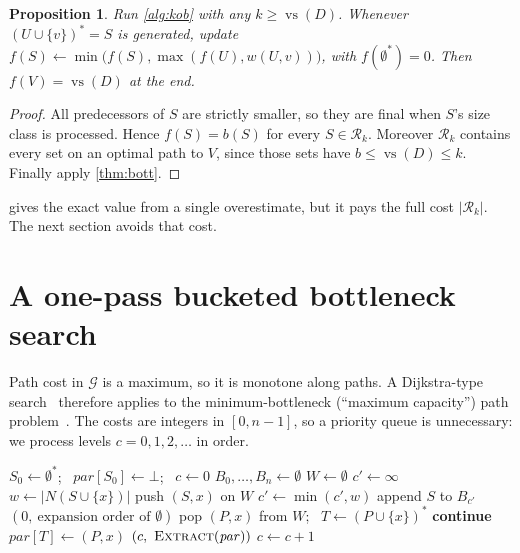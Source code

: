 \documentclass[11pt]{article}
\newtheorem{proposition}[theorem]{Proposition}
\theoremstyle{definition}
\newcommand{\vs}{\operatorname{vs}}
\newcommand{\Rel}{\mathcal{R}}
\newcommand{\Gr}{\mathcal{G}}
\newcommand{\cost}{w}
\newcommand{\bott}{b}
\newcommand{\set}[1]{\{#1\}}
\begin{document}
\begin{proposition}\label{prop:loose}
Run \cref{alg:kob} with any $k\ge\vs(D)$. Whenever $(U\cup\set v)^*=S$ is
generated, update
$f(S)\gets\min\bigl(f(S),\max(f(U),\cost(U,v))\bigr)$, with
$f(\emptyset^*)=0$. Then $f(V)=\vs(D)$ at the end.
\end{proposition}
\begin{proof}
All predecessors of $S$ are strictly smaller, so they are final when $S$'s
size class is processed. Hence $f(S)=\bott(S)$ for every $S\in\Rel_k$.
Moreover $\Rel_k$ contains every set on an optimal path to $V$, since those
sets have $\bott\le\vs(D)\le k$. Finally apply \cref{thm:bott}.
\end{proof}

 gives the exact value from a single overestimate, but it
pays the full cost $|\Rel_k|$. The next section avoids that cost.

\section{A one-pass bucketed bottleneck search}\label{sec:alg}

Path cost in $\Gr$ is a maximum, so it is monotone along paths. A
Dijkstra-type search~\cite{Dij59} therefore applies to the
minimum-bottleneck (``maximum capacity'') path problem~\cite{Pol60}. The
costs are integers in $[0,n-1]$, so a priority queue is unnecessary: we
process levels $c=0,1,2,\dots$ in order.

\begin{algorithm}[t]
\caption{One-pass bottleneck search with parent pointers.}\label{alg:bucket}
\begin{algorithmic}[1]
\State $S_0\gets\emptyset^*$; \ $\mathit{par}[S_0]\gets\bot$; \ $c\gets 0$
\State $B_0,\dots,B_n\gets\emptyset$ 
\State $W\gets\emptyset$ 
\Statex
{}\Comment{release arcs of cost in $(\ell,c]$; reschedule $S$}
  \State $c'\gets\infty$
    \State $w\gets|N(S\cup\set x)|$
     push $(S,x)$ on $W$
     $c'\gets\min(c',w)$ \EndIf
  \EndFor
   append $S$ to $B_{c'}$ \EndIf
\EndProcedure
\Statex
{} \Return $(0,\ \text{expansion order of }\emptyset)$ \EndIf
\State {}
\Loop
    \State pop $(P,x)$ from $W$; \ $T\gets(P\cup\set x)^*$
     \textbf{continue} \EndIf
    \State $\mathit{par}[T]\gets(P,x)$
     \Return $(c,\ \textsc{Extract}(\mathit{par}))$ \EndIf
    \State {}
  \EndWhile
  \State $c\gets c+1$
    \EndFor
\EndLoop
\end{algorithmic}
\end{algorithm}
\end{document}
